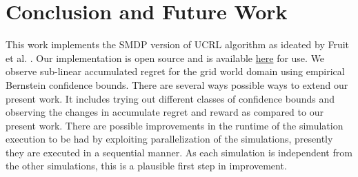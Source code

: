 
\chapter{Conclusion and Future Work}

This work implements the SMDP version of UCRL algorithm as ideated by Fruit et al. \cite{fruit_regret_2017}.
Our implementation is open source and is available \href{https://github.com/say4n/options}{here} for use.
We observe sub-linear accumulated regret for the grid world domain using empirical Bernstein confidence bounds.
There are several ways possible ways to extend our present work.
It includes trying out different classes of confidence bounds and observing the changes in accumulate regret and reward as compared to our present work.
There are possible improvements in the runtime of the simulation execution to be had by exploiting parallelization of the simulations, presently they are executed in a sequential manner.
As each simulation is independent from the other simulations, this is a plausible first step in improvement.

\newpage
